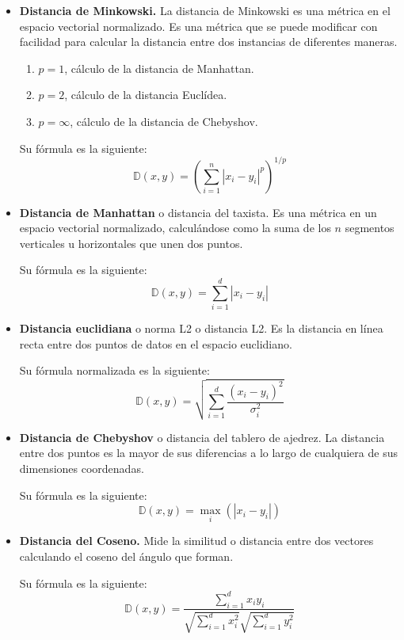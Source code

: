 \begin{itemize}
\item \textbf{Distancia de Minkowski.} La distancia de Minkowski es una métrica en el espacio vectorial normalizado. Es una métrica que se puede modificar con facilidad para calcular la distancia entre dos instancias de diferentes maneras. 
\begin{enumerate}
\item \(p = 1\), cálculo de la distancia de Manhattan.
\item \(p = 2\), cálculo de la distancia Euclídea.
\item \(p = \infty\), cálculo de la distancia de Chebyshov.
\end{enumerate}
Su fórmula es la siguiente:
\[ \mathbb{D}(x, y) = \left( \sum_{i=1}^{n}\left| x_i - y_i \right|^p \right)^{1/p} \]

\item \textbf{Distancia de Manhattan} o distancia del taxista. Es una métrica en un espacio vectorial normalizado, calculándose como la suma de los $n$ segmentos verticales u horizontales que unen dos puntos.

Su fórmula es la siguiente:
\[  \mathbb{D}(x, y) = \sum_{i=1}^{d}\left| x_i - y_i\right| \]

\item \textbf{Distancia euclidiana} o norma L2 o distancia L2. Es la distancia en línea recta entre dos puntos de datos en el espacio euclidiano.

Su fórmula normalizada es la siguiente:
\[  \mathbb{D}(x, y) = \sqrt{\sum_{i=1}^{d} \frac{\left(x_i - y_i\right)^2}{\sigma_i^2}}  \]

\item \textbf{Distancia de Chebyshov} o distancia del tablero de ajedrez. La distancia entre dos puntos es la mayor de sus diferencias a lo largo de cualquiera de sus dimensiones coordenadas.

Su fórmula es la siguiente:
\[  \mathbb{D}(x, y) = \max_i\left(\left|x_i - y_i\right|\right) \]

\item \textbf{Distancia del Coseno.} Mide la similitud o distancia entre dos vectores calculando el coseno del ángulo que forman.

Su fórmula es la siguiente:
\[ \mathbb{D}(x, y) = \frac{\sum_{i=1}^{d}x_iy_i}{\sqrt{\sum_{i=1}^{d}x_i^2}\sqrt{\sum_{i=1}^{d}y_i^2} } \]

\end{itemize}
